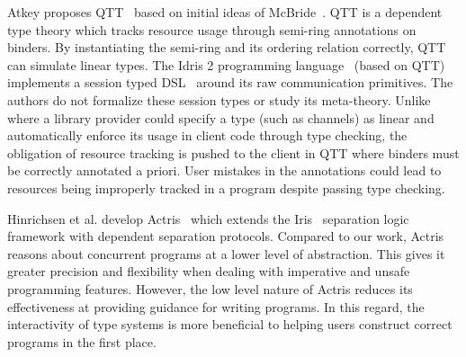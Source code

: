 Atkey proposes QTT~\cite{qtt} based on initial ideas of McBride~\cite{nothing}.
QTT is a dependent type theory which tracks resource usage through semi-ring
annotations on binders. By instantiating the semi-ring and its ordering relation
correctly, QTT can simulate linear types. The Idris 2 programming
language~\cite{idris2} (based on QTT) implements a session typed
DSL~\cite{brady21} around its raw communication primitives. The authors do not
formalize these session types or study its meta-theory. Unlike \TLLC{} where
a library provider could specify a type (such as channels) as linear and
automatically enforce its usage in client code through type checking, the
obligation of resource tracking is pushed to the client in QTT where binders
must be correctly annotated a priori. User mistakes in the annotations could
lead to resources being improperly tracked in a program despite passing type
checking. 

Hinrichsen et al. develop Actris~\cite{actris} which extends the
Iris~\cite{iris} separation logic framework with dependent separation protocols.
Compared to our work, Actris reasons about concurrent programs at a lower level
of abstraction. This gives it greater precision and flexibility when dealing
with imperative and unsafe programming features. However, the low level nature
of Actris reduces its effectiveness at providing guidance for writing programs.
In this regard, the interactivity of type systems is more beneficial to helping
users construct correct programs in the first place.

